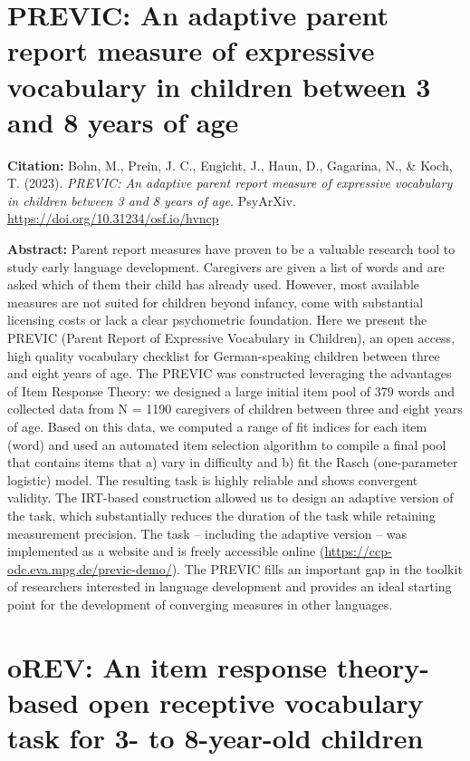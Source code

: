 \documentclass[
]{scrbook}
\begin{document}
\newpage

\section*{PREVIC: An adaptive parent report measure of expressive vocabulary in children between 3 and 8 years of age}\label{previc}

\textbf{Citation:} Bohn, M., Prein, J. C., Engicht, J., Haun, D., Gagarina, N., \& Koch, T. (2023). \emph{PREVIC: An adaptive parent report measure of expressive vocabulary in children between 3 and 8 years of age.} PsyArXiv. \mbox{\url{https://doi.org/10.31234/osf.io/hvncp}}

\textbf{Abstract:} Parent report measures have proven to be a valuable research tool to study early language development. Caregivers are given a list of words and are asked which of them their child has already used. However, most available measures are not suited for children beyond infancy, come with substantial licensing costs or lack a clear psychometric foundation. Here we present the PREVIC (Parent Report of Expressive Vocabulary in Children), an open access, high quality vocabulary checklist for German-speaking children between three and eight years of age. The PREVIC was constructed leveraging the advantages of Item Response Theory: we designed a large initial item pool of 379 words and collected data from N = 1190 caregivers of children between three and eight years of age. Based on this data, we computed a range of fit indices for each item (word) and used an automated item selection algorithm to compile a final pool that contains items that a) vary in difficulty and b) fit the Rasch (one-parameter logistic) model. The resulting task is highly reliable and shows convergent validity. The IRT-based construction allowed us to design an adaptive version of the task, which substantially reduces the duration of the task while retaining measurement precision. The task -- including the adaptive version -- was implemented as a website and is freely accessible online (\mbox{\url{https://ccp-odc.eva.mpg.de/previc-demo/}}). The PREVIC fills an important gap in the toolkit of researchers interested in language development and provides an ideal starting point for the development of converging measures in other languages.

\newpage

\section*{oREV: An item response theory-based open receptive vocabulary task for 3- to 8-year-old children}\label{orev}
\end{document}
